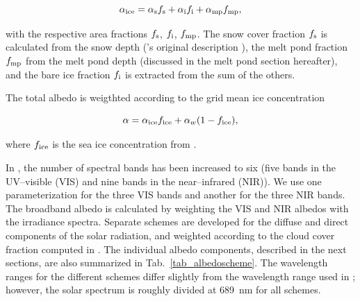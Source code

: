 \begin{equation}\label{eq_seaicealbedo}
\alpha_{\rm ice}=\alpha_{\rm s}f_{\rm s}+\alpha_{\rm i}f_{\rm
  i}+\alpha_{\rm mp}f_{\rm mp},
\end{equation}

with the respective area fractions $f_{\rm s}$, $f_{\rm i}$, $f_{\rm mp}$.
The snow cover fraction $f_{\rm s}$ is calculated from the snow depth
(\echam's original description \cite{roesch2000}), the melt pond fraction
$f_{\rm mp}$  from the melt pond depth (discussed in
the melt pond section hereafter), and the bare ice fraction $f_{\rm i}$ is
extracted from the sum of the others.

The total albedo is weigthted according to the grid
mean ice concentration

\begin{equation}
\alpha=\alpha_{\rm ice}f_{\rm ice}+\alpha_{w}(1-f_{\rm ice}),
\end{equation}

where $f_{\rm ice}$ is the sea ice concentration from \echam.

In \echam, the number of spectral bands has been
increased to six (five bands in the UV--visible (VIS) and nine bands
in the near--infrared (NIR)). We use one  parameterization for the
three VIS bands and 
another for the three NIR bands. The broadband albedo is calculated by
weighting the VIS and NIR albedos with the irradiance
spectra. Separate schemes are developed for the diffuse and direct
components of the solar radiation, and weighted according to the
cloud cover fraction computed in \echam. The individual albedo
components, described in the next sections, are also summarized in
Tab.~\ref{tab_albedoscheme}. The wavelength ranges for the different
schemes differ slightly from the wavelength range used in \echam;
however, the solar spectrum is roughly divided at 689~nm for all schemes.

